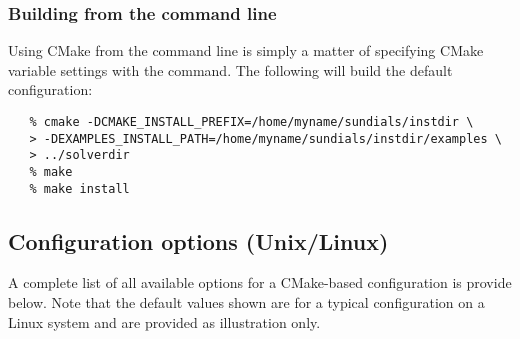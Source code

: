 

 
\subsubsection*{Building from the command line}

Using CMake from the command line is simply a matter of specifying CMake variable settings
with the  command.  The following will build the default configuration:  

\begin{verbatim}
   % cmake -DCMAKE_INSTALL_PREFIX=/home/myname/sundials/instdir \
   > -DEXAMPLES_INSTALL_PATH=/home/myname/sundials/instdir/examples \
   > ../solverdir
   % make
   % make install
\end{verbatim}


\subsection{Configuration options (Unix/Linux)}\label{ss:configuration_options_nix}

A complete list of all available options for a CMake-based {\sundials}
configuration is provide below. Note that the default values shown are for 
a typical configuration on a Linux system and are provided as illustration only.

